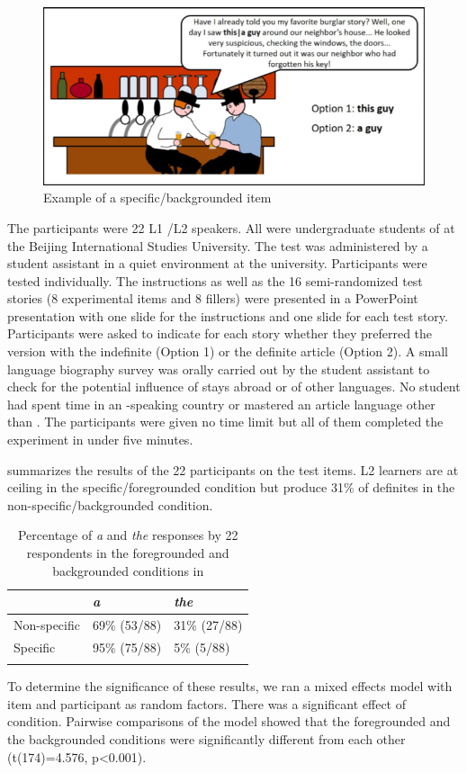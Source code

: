 \documentclass[output=paper,
modfonts
]{langscibook}
\begin{document}
\begin{figure}[h]
\includegraphics[height=.25\textheight]{figures/fig2.png}
\caption{Example of a specific/backgrounded item}
\label{fig:lebruyn:2}
\end{figure}

The participants were 22 L1 /L2  speakers. All were undergraduate students of  at the Beijing International Studies University. The test was administered by a student assistant in a quiet environment at the university. Participants were tested individually. The instructions as well as the 16 semi-randomized test stories (8 experimental items and 8 fillers) were presented in a PowerPoint presentation with one slide for the instructions and one slide for each test story. Participants were asked to indicate for each story whether they preferred the version with the indefinite (Option 1) or the definite article (Option 2). A small language biography survey was orally carried out by the student assistant to check for the potential influence of stays abroad or of other languages. No student had spent time in an -speaking country or mastered an article language other than . The participants were given no time limit but all of them completed the experiment in under five minutes.

 summarizes the results of the 22 participants on the test items. L2 learners are at ceiling in the specific/foregrounded condition but produce 31\% of definites in the non-specific/backgrounded condition.

\begin{table}[h]
\begin{tabularx}{.66\textwidth}{XXX}
\lsptoprule
 & \textit{a} & \textit{the} \\
\midrule
Non-specific & 69\% (53/88) & 31\% (27/88)  \\
Specific & 95\% (75/88) & 5\% (5/88) \\
\lspbottomrule
\end{tabularx}
\caption{Percentage of \textit{a} and \textit{the} responses by 22  respondents in the foregrounded and backgrounded conditions in \citet{LeBruynDong2017T}}
\label{tab:lebruyn:7}
\end{table}
\newpage
To determine the significance of these results, we ran a mixed effects model with item and participant as random factors. There was a significant effect of condition. Pairwise comparisons of the model showed that the foregrounded and the backgrounded conditions were significantly different from each other (t(174)=4.576, p<0.001).
\end{document}
